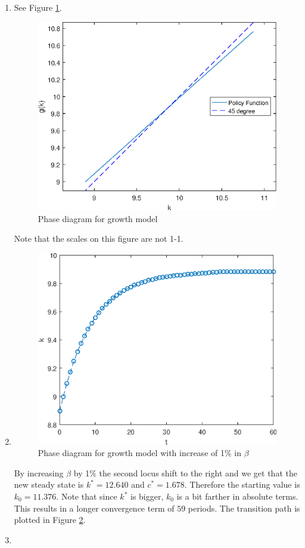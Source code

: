 \documentclass[12pt]{article}
\newcommand{\1}{{\bf 1}} %
\begin{document}
\begin{enumerate}[(1)]
		
		\item 
		See Figure \ref{fig:fig2}.
				\begin{figure}[H]
			\centering
			\includegraphics[width=0.7\linewidth]{fig2}
			\caption{Phase diagram for growth model}
			\label{fig:fig2}
		\end{figure}
		 Note that the scales on this figure are not 1-1.
		\item 
				\begin{figure}[H]
			\centering
			\includegraphics[width=0.7\linewidth]{fig3}
			\caption{Phase diagram for growth model with increase of 1\% in $\beta$}
			\label{fig:fig3}
		\end{figure}
By increasing $\beta$ by 1\% the second locus shift to the right and we get that the new steady state is $k^*=12.640$ and $c^*=1.678$. Therefore the starting value is $k_0 = 11.376$. Note that since $k^*$ is bigger, $k_0$ is a bit farther in absolute terms. This results in a longer convergence term of $59$ periods. The transition path is plotted in Figure \ref{fig:fig3}.


		\item 
		

\end{enumerate}
\end{document}
